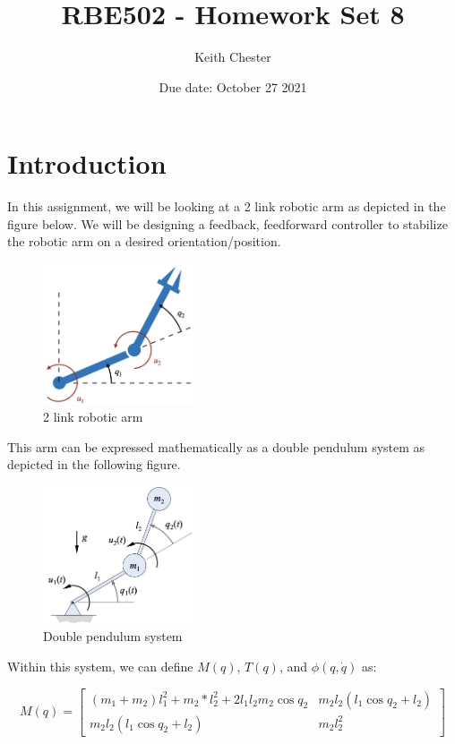 \documentclass{article}
\title{RBE502 - Homework Set 8}
\author{Keith Chester}
\date{Due date: October 27 2021}
\begin{document}
\maketitle

\section*{Introduction}

In this assignment, we will be looking at a 2 link robotic arm as depicted in the figure below. We will be designing a feedback, feedforward controller to stabilize the robotic arm on a desired orientation/position.

\begin{figure}[H]
    \centering
    \includegraphics[width = 0.4\textwidth]{figures/2D-rr.001.jpeg}
    \caption{2 link robotic arm}
    \label{fig:robot-arm}
\end{figure}

This arm can be expressed mathematically as a double pendulum system as depicted in the following figure.

\begin{figure}
    \centering
    \includegraphics[width=0.4\textwidth]{figures/doublependulum.jpg}
    \caption{Double pendulum system}
    \label{fig:double-pendulum}
\end{figure}

Within this system, we can define $M(q)$, $T(q)$, and $\phi(q, \dot{q})$ as:

\begin{equation}
    M(q) = \begin{bmatrix}
        (m_1 + m_2)l_1^2+m_2*l_2^2+2l_1l_2m_2\cos{q_2} & m_2l_2(l_1\cos{q_2}+l_2) \\
        m_2l_2(l_1\cos{q_2}+l_2) & m_2l_2^2
    \end{bmatrix}
\end{equation}
\end{document}
